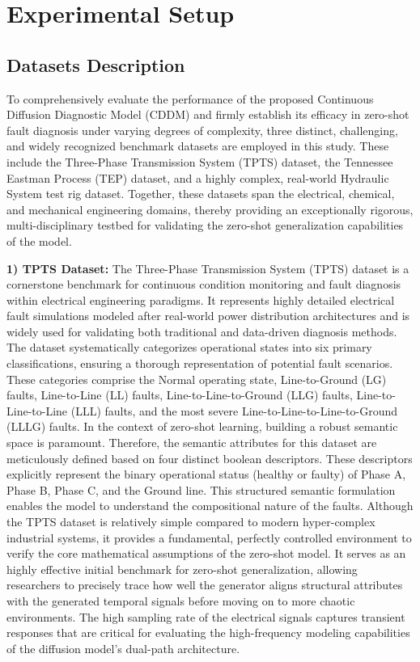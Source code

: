 \section{Experimental Setup}

\subsection{Datasets Description}
To comprehensively evaluate the performance of the proposed Continuous Diffusion Diagnostic Model (CDDM) and firmly establish its efficacy in zero-shot fault diagnosis under varying degrees of complexity, three distinct, challenging, and widely recognized benchmark datasets are employed in this study. These include the Three-Phase Transmission System (TPTS) dataset, the Tennessee Eastman Process (TEP) dataset, and a highly complex, real-world Hydraulic System test rig dataset. Together, these datasets span the electrical, chemical, and mechanical engineering domains, thereby providing an exceptionally rigorous, multi-disciplinary testbed for validating the zero-shot generalization capabilities of the model.

\textbf{1) TPTS Dataset:} The Three-Phase Transmission System (TPTS) dataset is a cornerstone benchmark for continuous condition monitoring and fault diagnosis within electrical engineering paradigms. It represents highly detailed electrical fault simulations modeled after real-world power distribution architectures and is widely used for validating both traditional and data-driven diagnosis methods. The dataset systematically categorizes operational states into six primary classifications, ensuring a thorough representation of potential fault scenarios. These categories comprise the Normal operating state, Line-to-Ground (LG) faults, Line-to-Line (LL) faults, Line-to-Line-to-Ground (LLG) faults, Line-to-Line-to-Line (LLL) faults, and the most severe Line-to-Line-to-Line-to-Ground (LLLG) faults. In the context of zero-shot learning, building a robust semantic space is paramount. Therefore, the semantic attributes for this dataset are meticulously defined based on four distinct boolean descriptors. These descriptors explicitly represent the binary operational status (healthy or faulty) of Phase A, Phase B, Phase C, and the Ground line. This structured semantic formulation enables the model to understand the compositional nature of the faults. Although the TPTS dataset is relatively simple compared to modern hyper-complex industrial systems, it provides a fundamental, perfectly controlled environment to verify the core mathematical assumptions of the zero-shot model. It serves as an highly effective initial benchmark for zero-shot generalization, allowing researchers to precisely trace how well the generator aligns structural attributes with the generated temporal signals before moving on to more chaotic environments. The high sampling rate of the electrical signals captures transient responses that are critical for evaluating the high-frequency modeling capabilities of the diffusion model's dual-path architecture.

